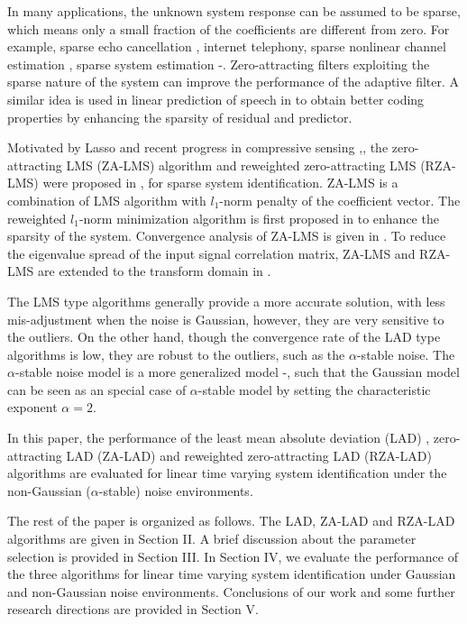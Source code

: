 \documentclass[conference]{IEEEtran}
\begin{document}
In many applications, the unknown system response can be assumed to be sparse, which means only a small fraction of the coefficients are different from zero. For example,  sparse echo cancellation \cite{ref20}, internet  telephony, sparse nonlinear channel estimation \cite{ref33}, sparse system estimation \cite{ref34}-\cite{ref35}. Zero-attracting filters exploiting the sparse nature of the system can improve the  performance of the adaptive filter. A similar idea is used in linear prediction of speech in \cite{ref36} to obtain better coding properties by enhancing the sparsity of residual and predictor.  

Motivated by Lasso \cite{ref10} and recent progress in compressive
sensing \cite{ref11},\cite{ref12}, the zero-attracting LMS (ZA-LMS) algorithm and reweighted  zero-attracting LMS (RZA-LMS) were proposed in \cite{ref24},  for sparse system identification.  ZA-LMS is a combination of LMS algorithm with $l_1$-norm penalty of the coefficient vector. The reweighted $l_1$-norm minimization algorithm is first proposed in \cite{refrl} to enhance the sparsity of the system. Convergence analysis of ZA-LMS is given in \cite{ref25}. To reduce the eigenvalue spread of the input signal correlation matrix, ZA-LMS and RZA-LMS are extended to the transform domain in \cite{ref26}. 

The LMS type algorithms generally provide a more accurate solution, with less mis-adjustment when the noise is Gaussian, however, they are very sensitive to the outliers. On the other hand, though the convergence rate of the LAD type algorithms is low,  they are robust to the outliers, such as the $\alpha$-stable noise. The $\alpha$-stable noise model is a more generalized model \cite{ref6lmp}-\cite{ref7lmpsi}, such that the Gaussian model can be seen as an special case of $\alpha$-stable model by setting the characteristic exponent $\alpha = 2$.

In this paper, the performance of the least mean absolute deviation (LAD) \cite{ref6lmp}, zero-attracting LAD (ZA-LAD) \cite{ref32} and reweighted  zero-attracting LAD (RZA-LAD) algorithms are evaluated for linear time varying system identification under the non-Gaussian ($\alpha$-stable)  noise environments. 

The rest of the paper is organized as follows. The LAD, ZA-LAD and RZA-LAD algorithms are given in Section II. A brief discussion about the parameter selection is provided in Section III. In Section IV, we evaluate the performance of the three algorithms for linear time varying system identification under Gaussian and non-Gaussian noise environments.  Conclusions of our work and  some further research directions are provided in Section V.
\end{document}
